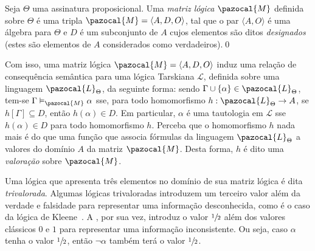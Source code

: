         \begin{definicao}\label{def:matlog}
            Seja $\Theta$ uma assinatura proposicional. Uma \textit{matriz lógica} $\pazocal{M}$ definida sobre $\Theta$ é uma tripla $\pazocal{M} = \langle A, D, O \rangle$, tal que o par $\langle A, O \rangle$ é uma álgebra para $\Theta$ e $D$ é um subconjunto de $A$ cujos elementos são ditos \textit{designados} (estes são elementos de $A$ considerados como verdadeiros).\qed{}
        \end{definicao}

        Com isso, uma matriz lógica $\pazocal{M} = \langle A, D, O \rangle$ induz uma relação de consequência semântica para uma lógica Tarskiana $\mathcal{L}$, definida sobre uma linguagem $\pazocal{L}_{\Theta}$, da seguinte forma: sendo $\Gamma \cup \{\alpha\} \in \pazocal{L}_{\Theta}$, tem-se $\Gamma \vDash_{\pazocal{M}} \alpha$ sse, para todo homomorfismo $h : \pazocal{L}_{\Theta} \to A$, se $h[\Gamma] \subseteq D$, então $h(\alpha) \in D$. Em particular, $\alpha$ é uma tautologia em $\mathcal{L}$ sse $h(\alpha) \in D$ para todo homomorfismo $h$. Perceba que o homomorfismo $h$ nada mais é do que uma função que associa fórmulas da linguagem $\pazocal{L}_{\Theta}$ a valores do domínio $A$ da matriz $\pazocal{M}$. Desta forma, $h$ é dito uma \textit{valoração} sobre $\pazocal{M}$.


       Uma lógica que apresenta três elementos no domínio de sua matriz lógica é dita \textit{trivalorada}. Algumas lógicas trivaloradas introduzem um terceiro valor além da verdade e falsidade para representar uma informação desconhecida, como é o caso da lógica de Kleene~\cite{manyvalued}. A \lfium{}, por sua vez, introduz o valor $\sfrac{1}{2}{}$ além dos valores clássicos $0$ e $1$ para representar uma informação inconsistente. Ou seja, caso $\alpha$ tenha o valor $\sfrac{1}{2}{}$, então $\neg \alpha$ também terá o valor $\sfrac{1}{2}{}$.


